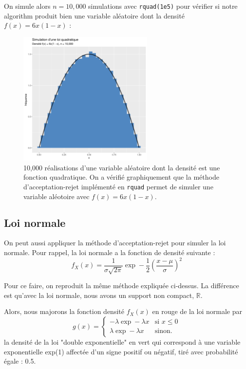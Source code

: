 \documentclass[10pt]{article} %
\begin{document}
On simule alors $n = 10,000$ simulations avec \texttt{rquad(1e5)} pour vérifier si notre algorithm produit bien une variable aléatoire dont la densité
$f(x) = 6x(1 - x)$ :

\begin{figure}[h!]
    \centering
    \includegraphics[width=0.6\textwidth]{media/rquad_sim.png}
    \caption{10,000 réalisations d'une variable aléatoire dont la densité est une fonction quadratique. On a vérifié graphiquement que la méthode d'acceptation-rejet implémenté en \texttt{rquad}
    permet de simuler une variable aléotoire avec $f(x) = 6x(1 - x)$.}
\end{figure}


\subsection{Loi normale}

On peut aussi appliquer la méthode d'acceptation-rejet pour simuler la loi normale. Pour rappel, la loi normale a la fonction de densité suivante :
$$f_X(x) = \frac{1}{\sigma \sqrt{2\pi}}\exp-\frac{1}{2}(\frac {x-\mu}{\sigma})^2$$

Pour ce faire, on reproduit la même méthode expliquée ci-dessus. La différence est qu'avec la loi normale, nous avons un support non compact, $  \mathbb{R} $.

Alors, nous majorons la fonction densité $f_X(x)$ en rouge de la loi normale par
$$g(x) = \left\{
    \begin{array}{ll}
        -\lambda\exp-\lambda x & \mbox{si } x \le 0 \\
        \lambda\exp-\lambda x & \mbox{sinon.}
    \end{array}
\right. $$
la densité de la loi "double exponentielle" en vert qui correspond à une variable exponentielle exp(1) affectée d'un signe positif ou négatif, tiré avec probabilité égale : 0.5.
\end{document}
